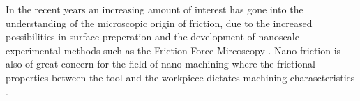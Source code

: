In the recent years an increasing amount of interest has gone into the understanding of the microscopic origin of friction, due to the increased possibilities in surface preperation and the development of nanoscale experimental methods such as the Friction Force Mircoscopy \cite{FK2D}. Nano-friction is also of great concern for the field of nano-machining where the frictional properties between the tool and the workpiece dictates machining charascteristics \cite{kim_nano-scale_2009}.








\cite{PhysRevResearch.2.042006}
